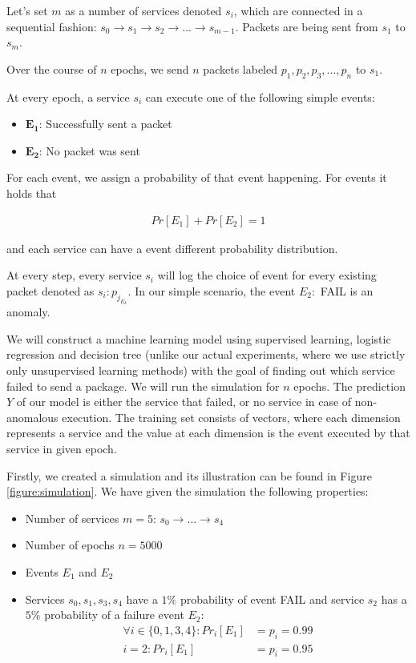 Let's set $m$ as a number of services denoted $s_i$, which are connected in a sequential fashion: $s_0 \rightarrow s_1 \rightarrow s_2 \rightarrow ... \rightarrow s_{m-1}$. Packets are being sent from $s_1$ to $s_m$.

Over the course of $n$ epochs, we send $n$ packets labeled $p_1, p_2, p_3, ..., p_n$ to $s_1$.

At every epoch, a service $s_i$ can execute one of the following simple events: 

\begin{itemize}
    \item $\mathbf{E_1}$: Successfully sent a packet
    \item $\mathbf{E_2}$: No packet was sent
\end{itemize}

For each event, we assign a probability of that event happening. For events it holds that 

\begin{gather*}
    Pr[E_1] + Pr[E_2] = 1
\end{gather*}

and each service can have a event different probability distribution.

At every step, every service $s_i$ will log the choice of event for every existing packet denoted as $s_i: p_{j_{E_k}}$. In our simple scenario, the event $E_2:$ FAIL is an anomaly. 

We will construct a machine learning model using supervised learning, logistic regression and decision tree (unlike our actual experiments, where we use strictly only unsupervised learning methods) with the goal of finding out which service failed to send a package. We will run the simulation for $n$ epochs. The prediction $Y$ of our model is either the service that failed, or no service in case of non-anomalous execution. The training set consists of vectors, where each dimension represents a service and the value at each dimension is the event executed by that service in given epoch. 

Firstly, we created a simulation and its illustration can be found in Figure \ref{figure:simulation}. We have given the simulation the following properties: 

\begin{itemize}
    \item Number of services $m = 5$: $s_0 \rightarrow ... \rightarrow s_{4}$
    \item Number of epochs $n = 5000$
    \item Events $E_1$ and $E_2$
    \item Services $s_0, s_1, s_3, s_4$ have a $1\%$ probability of event FAIL and service $s_2$ has a $5\%$ probability of a failure event $E_2$:
    \begin{align*}
        \forall i \in \{0, 1, 3, 4\}: Pr_i[E_1] &= p_i = 0.99 \\
        i = 2: Pr_i[E_1] &= p_i = 0.95
    \end{align*}
\end{itemize}

